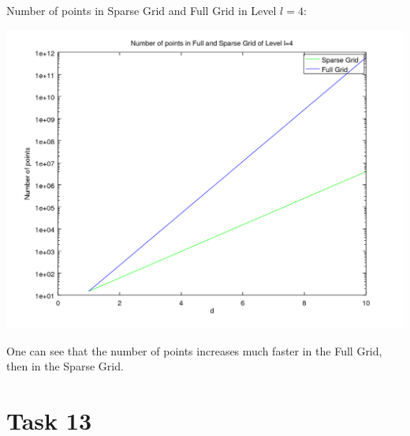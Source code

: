 \documentclass[10pt,a4paper]{article}
\begin{document}
Number of points in Sparse Grid and Full Grid in Level $l=4$:
\begin{center}
\includegraphics[scale=0.5]{number_of_points_SG_FG.png}
\end{center}
One can see that the number of points increases much faster in the Full Grid, then in the Sparse Grid.

\section*{Task 13}
\end{document}
